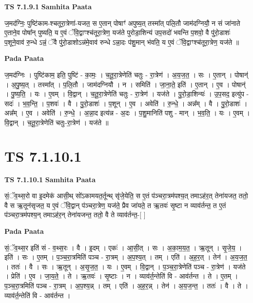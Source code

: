 \documentclass[17pt]{extarticle}
\begin{document}
\textbf{TS 7.1.9.1 } \newline
\textbf{Samhita Paata} \newline

ज॒मद॑ग्निः॒ पुष्टि॑काम-श्चतूरा॒त्रेणा॑-यजत॒ स ए॒तान् पोषाꣳ॑ अपुष्य॒त् तस्मा᳚त् पलि॒तौ जाम॑दग्नियौ॒ न सं जा॑नाते ए॒ताने॒व पोषा᳚न् पुष्यति॒ य ए॒वं ॅवि॒द्वाꣳश्च॑तूरा॒त्रेण॒ यज॑ते पुरोडा॒शिन्य॑ उप॒सदो॑ भवन्ति प॒शवो॒ वै पु॑रो॒डाशः॑ प॒शूने॒वाव॑ रु॒न्धे ऽन्नं॒ ॅवै पु॑रो॒डाशोऽन्न॑मे॒वाव॑ रुन्धे ऽन्ना॒दः प॑शु॒मान् भ॑वति॒ य ए॒वं ॅवि॒द्वाꣳश्च॑तूरा॒त्रेण॒ यज॑ते ॥ \newline

\textbf{Pada Paata} \newline

ज॒मद॑ग्निः । पुष्टि॑काम॒ इति॒ पुष्टि॑ - का॒मः॒ । च॒तू॒रा॒त्रेणेति॑ चतुः - रा॒त्रेण॑ । अ॒य॒ज॒त॒ । सः । ए॒तान् । पोषान्॑ । अ॒पु॒ष्य॒त् । तस्मा᳚त् । प॒लि॒तौ । जाम॑दग्नियौ । न । समिति॑ । जा॒ना॒ते॒ इति॑ । ए॒तान् । ए॒व । पोषान्॑ । पु॒ष्य॒ति॒ । यः । ए॒वम् । वि॒द्वान् । च॒तू॒रा॒त्रेणेति॑ चतुः - रा॒त्रेण॑ । यज॑ते । पु॒रो॒डा॒शिन्यः॑ । उ॒प॒सद॒ इत्यु॑प - सदः॑ । भ॒व॒न्ति॒ । प॒शवः॑ । वै । पु॒रो॒डाशः॑ । प॒शून् । ए॒व । अवेति॑ । रु॒न्धे॒ । अन्न᳚म् । वै । पु॒रो॒डाशः॑ । अन्न᳚म् । ए॒व । अवेति॑ । रु॒न्धे॒ । अ॒न्ना॒द इत्य॑न्न - अ॒दः । प॒शु॒मानिति॑ पशु - मान् । भ॒व॒ति॒ । यः । ए॒वम् । वि॒द्वान् । च॒तू॒रा॒त्रेणेति॑ चतुः-रा॒त्रेण॑ । यज॑ते ॥  \newline





\section{ TS 7.1.10.1 }

\textbf{TS 7.1.10.1 } \newline
\textbf{Samhita Paata} \newline

सं॒ॅव॒थ्स॒रो वा इ॒दमेक॑ आसी॒थ् सो॑ऽकामयत॒र्तून्थ् सृ॑जे॒येति॒ स ए॒तं प॑ञ्चरा॒त्रम॑पश्य॒त् तमाऽह॑र॒त् तेना॑यजत॒ ततो॒ वै स ऋ॒तून॑सृजत॒ य ए॒वं ॅवि॒द्वान् प॑ञ्चरा॒त्रेण॒ यज॑ते॒ प्रैव जा॑यते॒ त ऋ॒तवः॑ सृ॒ष्टा न व्याव॑र्तन्त॒ त ए॒तं प॑ञ्चरा॒त्रम॑पश्य॒न् तमाऽह॑र॒न् तेना॑यजन्त॒ ततो॒ वै ते व्याव॑र्तन्त॒-[  ] \newline

\textbf{Pada Paata} \newline

सं॒ॅव॒थ्स॒र इति॑ सं - व॒थ्स॒रः । वै । इ॒दम् । एकः॑ । आ॒सी॒त् । सः । अ॒का॒म॒य॒त॒ । ऋ॒तून् । सृ॒जे॒य॒ । इति॑ । सः । ए॒तम् । प॒ञ्च॒रा॒त्रमिति॑ पञ्च - रा॒त्रम् । अ॒प॒श्य॒त् । तम् । एति॑ । अ॒ह॒र॒त् । तेन॑ । अ॒य॒ज॒त॒ । ततः॑ । वै । सः । ऋ॒तून् । अ॒सृ॒ज॒त॒ । यः । ए॒वम् । वि॒द्वान् । प॒ञ्च॒रा॒त्रेणेति॑ पञ्च - रा॒त्रेण॑ । यज॑ते । प्रेति॑ । ए॒व । जा॒य॒ते॒ । ते । ऋ॒तवः॑ । सृ॒ष्टाः । न । व्याव॑र्त॒न्तेति॑ वि - आव॑र्तन्त । ते । ए॒तम् । प॒ञ्च॒रा॒त्रमिति॑ पञ्च - रा॒त्रम् । अ॒प॒श्य॒न्न् । तम् । एति॑ । अ॒ह॒र॒न्न् । तेन॑ । अ॒य॒ज॒न्त॒ । ततः॑ । वै । ते । व्याव॑र्त॒न्तेति॑ वि - आव॑र्तन्त ।  \newline
\end{document}
